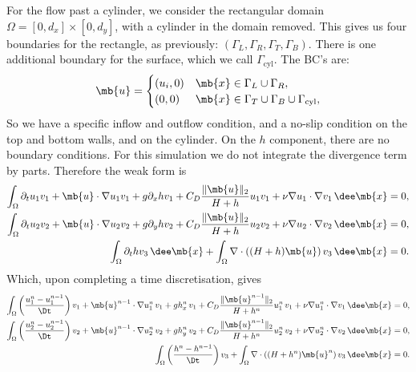 \documentclass[11pt]{article}
\begin{document}
For the flow past a cylinder, we consider the rectangular domain
$\Omega = [0, d_x] \times [0, d_y]$, with a cylinder in the domain removed. This
gives us four boundaries for the rectangle, as previously: $(\Gamma_L, \Gamma_R,
\Gamma_T, \Gamma_B)$. There is one additional boundary for the surface, which we
call $\Gamma_{\mathrm{cyl}}$. The BC's are:
\[
  \mb{u} =
  \begin{cases}
    (u_i, 0) & \mb{x} \in \Gamma_L \cup \Gamma_R, \\
    (0, 0) & \mb{x} \in \Gamma_T \cup \Gamma_B \cup \Gamma_{\mathrm{cyl}}, \\
  \end{cases}
\]
So we have a specific inflow and outflow condition, and a no-slip condition on
the top and bottom walls, and on the cylinder. On the $h$ component, there are
no boundary conditions. For this simulation we do not integrate the divergence
term by parts. Therefore the weak form is
\begin{align*}
  \int_\Omega
  \partial_t u_1 v_1 +  \mb{u} \cdot \nabla u_1 v_1 +  g \partial_x h v_1
  + C_D \frac{\lVert \mb{u} \rVert_2}{H + h} u_1 v_1
  + \nu \nabla u_1 \cdot \nabla v_1 \, \dee \mb{x} &= 0, \\
  \int_\Omega \partial_t u_2 v_2 +  \mb{u} \cdot \nabla u_2 v_2 +  g \partial_y h v_2
  + C_D \frac{\lVert \mb{u} \rVert_2}{H + h} u_2 v_2
  + \nu \nabla u_2 \cdot \nabla v_2 \, \dee \mb{x} &= 0, \\
  \int_\Omega \partial_t h v_3 \, \dee \mb{x}
  + \int_\Omega \nabla \cdot \left( (H + h) \mb{u} \right) v_3 \, \dee \mb{x} &= 0.
\end{align*}
Which, upon completing a time discretisation, gives
\begin{align*}
  \int_\Omega
  \left(\frac{ u_1^n - u_1^{n - 1}}{\Dt} \right) v_1
  + \mb{u}^{n - 1} \cdot \nabla u_1^n \, v_1
  + g h_x^n \, v_1
  + C_D \frac{\lVert \mb{u}^{n - 1} \rVert_2}{H + h^n} u_1^n \, v_1
  + \nu \nabla u_1^n \cdot \nabla v_1 \, \dee \mb{x} &= 0, \\
  \int_\Omega \left( \frac{u_2^n - u_2^{n - 1}}{\Dt} \right) v_2
  + \mb{u}^{n - 1} \cdot \nabla u_2^n \, v_2
  + g h_y^n \, v_2
  + C_D \frac{\lVert \mb{u}^{n - 1} \rVert_2}{H + h^n} u_2^n \, v_2
  + \nu \nabla u_2^n \cdot \nabla v_2 \, \dee \mb{x} &= 0, \\
  \int_\Omega \left( \frac{h^n - h^{n - 1}}{\Dt} \right) v_3
  + \int_\Omega \nabla \cdot \left( (H + h^n) \mb{u}^n \right) v_3 \, \dee \mb{x} &= 0.
\end{align*}
\end{document}
